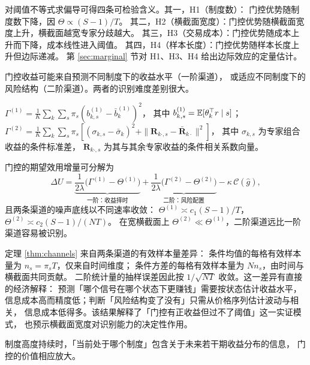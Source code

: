 \begin{remark}[四条比较静态]
\label{rem:comparative}
对阈值不等式求偏导可得四条可检验含义。其一，H1（制度数）：
门控优势随制度数下降，因 $\Theta\propto(S-1)/T$。
其二，H2（横截面宽度）：门控优势随横截面宽度上升，横截面越宽专家分歧越大。
其三，H3（交易成本）：门控优势随成本上升而下降，成本线性进入阈值。
其四，H4（样本长度）：门控优势随样本长度上升但边际递减。
第 \ref{sec:marginal} 节对 H1、H3、H4 给出边际效应的定量估计。
\end{remark}

门控收益可能来自预测不同制度下的收益水平（一阶渠道），
或适应不同制度下的风险结构（二阶渠道）。两者的识别难度差别很大。

\begin{definition}[一阶与二阶互补性]
$\Gamma^{(1)}=\frac1K\sum_k\sum_s\pi_s(b^{(1)}_{k,s}-\bar b^{(1)}_k)^2$，
其中 $b^{(1)}_{k,s}=\mathbb{E}[\theta_k^\top r\mid s]$；
$\Gamma^{(2)}=\frac1K\sum_k\sum_s\pi_s[(\sigma_{k,s}-\bar\sigma_k)^2
+\|\mathbf{R}_{k\cdot,s}-\bar{\mathbf{R}}_{k\cdot}\|^2]$，
其中 $\sigma_{k,s}$ 为专家组合收益的条件标准差，
$\mathbf{R}_{k\cdot,s}$ 为其与其余专家收益的条件相关系数向量。
\end{definition}

\begin{theorem}[两条渠道及其不同噪声底线]
\label{thm:channels}
门控的期望效用增量可分解为
\begin{equation}
\Delta U=\underbrace{\frac{1}{2\lambda}\Big(\Gamma^{(1)}-\Theta^{(1)}\Big)}_{\text{一阶：收益择时}}
+\underbrace{\frac{1}{2\lambda}\Big(\Gamma^{(2)}-\Theta^{(2)}\Big)}_{\text{二阶：风险配置}}
-\kappa\,\mathcal{C}(\hat g),
\label{eq:channel-decomp}
\end{equation}
且两条渠道的噪声底线以不同速率收敛：
$\Theta^{(1)}\asymp c_1(S-1)/T$，$\Theta^{(2)}\asymp c_2(S-1)/(NT)$。
在宽横截面上 $\Theta^{(2)}\ll\Theta^{(1)}$，二阶渠道远比一阶渠道容易被识别。
\end{theorem}

定理 \ref{thm:channels} 来自两条渠道的有效样本量差异：
条件均值的每格有效样本量为 $n_s=\pi_sT$，仅来自时间维度；
条件方差的每格有效样本量为 $Nn_s$，由时间与横截面共同贡献。
二阶统计量的抽样误差因此按 $1/\sqrt{NT}$ 收敛。这一差异有直接的经济解释：
预测「哪个信号在哪个状态下更赚钱」需要按状态估计收益水平，
信息成本高而精度低；判断「风险结构变了没有」只需从价格序列估计波动与相关，
信息成本低得多。该结果解释了「门控有正收益但过不了阈值」这一实证模式，
也预示横截面宽度对识别能力的决定性作用。

制度高度持续时，「当前处于哪个制度」包含关于未来若干期收益分布的信息，
门控的价值相应放大。

